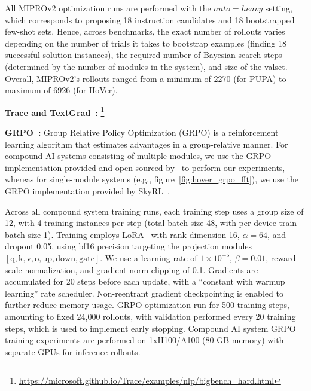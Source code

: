 \documentclass{article} %
\begin{document}
All MIPROv2 optimization runs are performed with the $auto=heavy$ setting, which corresponds to proposing 18 instruction candidates and 18 bootstrapped few-shot sets. Hence, across benchmarks, the exact number of rollouts varies depending on the number of trials it takes to bootstrap examples (finding 18 successful solution instances), the required number of Bayesian search steps (determined by the number of modules in the system), and size of the valset. Overall, MIPROv2's rollouts ranged from a minimum of 2270 (for PUPA) to maximum of 6926 (for HoVer).

\textbf{Trace and TextGrad~\citep{cheng2024traceautodiffgenerativeoptimization, textgrad}:} \footnote{\url{https://microsoft.github.io/Trace/examples/nlp/bigbench_hard.html}}


\textbf{GRPO~\citep{grpo_paper}:}
Group Relative Policy Optimization (GRPO) is a reinforcement learning algorithm that estimates advantages in a group-relative manner. For compound AI systems consisting of multiple modules, we use the GRPO implementation provided and open-sourced by~\citet{mmgrpo_future_ref} to perform our experiments, whereas for single-module systems (e.g., figure~\ref{fig:hover_grpo_fft}), we use the GRPO implementation provided by SkyRL~\citep{griggs2025skrylv01, liu2025skyrlsql, cao2025skyrl}.

Across all compound system training runs, each training step uses a group size of 12, with 4 training instances per step (total batch size 48, with per device train batch size 1). Training employs LoRA~\citep{lora_paper} with rank dimension 16, $\alpha=64$, and dropout 0.05, using bf16 precision targeting the projection modules $[\mathrm{q}, \mathrm{k}, \mathrm{v}, \mathrm{o}, \mathrm{up}, \mathrm{down}, \mathrm{gate}]$. We use a learning rate of $1\times10^{-5}$, $\beta=0.01$, reward scale normalization, and gradient norm clipping of 0.1. Gradients are accumulated for 20 steps before each update, with a ``constant with warmup learning'' rate scheduler. Non-reentrant gradient checkpointing is enabled to further reduce memory usage. GRPO optimization run for 500 training steps, amounting to fixed 24,000 rollouts, with validation performed every 20 training steps, which is used to implement early stopping. Compound AI system GRPO training experiments are performed on 1xH100/A100 (80 GB memory) with separate GPUs for inference rollouts.
\end{document}
